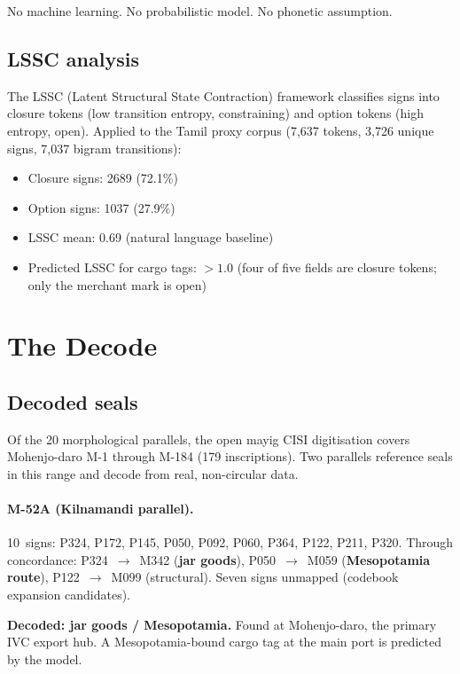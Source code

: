 \noindent
No machine learning. No probabilistic model. No phonetic assumption.

\subsection{LSSC analysis}

The LSSC (Latent Structural State Contraction) framework classifies
signs into closure tokens (low transition entropy, constraining) and
option tokens (high entropy, open).
Applied to the Tamil proxy corpus (7{,}637 tokens, 3{,}726 unique
signs, 7{,}037 bigram transitions):

\begin{itemize}
\item Closure signs: \num{2689} (72.1\%)
\item Option signs: \num{1037} (27.9\%)
\item LSSC mean: 0.69 (natural language baseline)
\item Predicted LSSC for cargo tags: $>1.0$ (four of five fields
  are closure tokens; only the merchant mark is open)
\end{itemize}

\section{The Decode}

\subsection{Decoded seals}

Of the 20 morphological parallels, the open mayig CISI digitisation
covers Mohenjo-daro M-1 through M-184 (179 inscriptions).
Two parallels reference seals in this range and decode from real,
non-circular data.

\paragraph{M-52A (Kilnamandi parallel).}
10~signs: P324, P172, P145, P050, P092, P060, P364, P122, P211,
P320.
Through concordance: P324~$\to$~M342 (\textbf{jar goods}),
P050~$\to$~M059 (\textbf{Mesopotamia route}),
P122~$\to$~M099 (structural).
Seven signs unmapped (codebook expansion candidates).

\textbf{Decoded: jar goods / Mesopotamia.}
Found at Mohenjo-daro, the primary IVC export hub.
A Mesopotamia-bound cargo tag at the main port is predicted by the
model.

